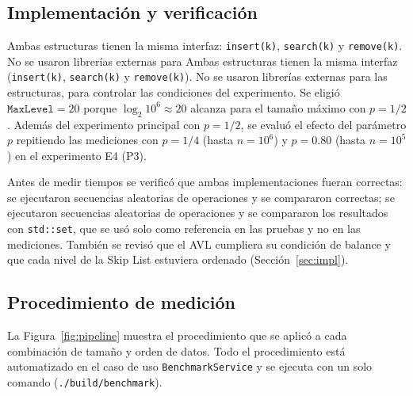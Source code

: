 \documentclass[11pt,a4paper]{article}
\begin{document}
\subsection{Implementación y verificación}

Ambas estructuras tienen la misma interfaz: \texttt{insert(k)},
\texttt{search(k)} y \texttt{remove(k)}. No se usaron librerías externas para
Ambas estructuras tienen la misma interfaz (\texttt{insert(k)},
\texttt{search(k)} y \texttt{remove(k)}). No se usaron librerías externas para
las estructuras, para controlar las condiciones del experimento. Se eligió
$\texttt{MaxLevel} = 20$ porque $\log_2 10^6 \approx 20$ alcanza para el
tamaño máximo con $p = 1/2$. Además del experimento principal con $p = 1/2$, se
evaluó el efecto del parámetro $p$ repitiendo las mediciones con $p = 1/4$
(hasta $n = 10^6$) y $p = 0.80$ (hasta $n = 10^5$) en el experimento E4 (P3).

Antes de medir tiempos se verificó que ambas implementaciones fueran
correctas: se ejecutaron secuencias aleatorias de operaciones y se compararon
correctas; se ejecutaron secuencias aleatorias de operaciones y se compararon
los resultados con \texttt{std::set}, que se usó solo como referencia en las
pruebas y no en las mediciones. También se revisó que el AVL cumpliera su
condición de balance y que cada nivel de la Skip List estuviera ordenado
(Sección~\ref{sec:impl}).

\subsection{Procedimiento de medición}

La Figura~\ref{fig:pipeline} muestra el procedimiento que se aplicó a cada
combinación de tamaño y orden de datos. Todo el procedimiento está automatizado
en el caso de uso \texttt{BenchmarkService} y se ejecuta con un solo comando
(\texttt{./build/benchmark}).
\end{document}
